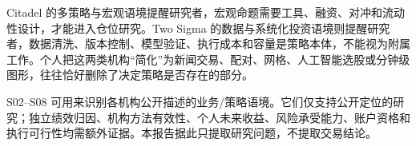 Citadel 的多策略与宏观语境提醒研究者，宏观命题需要工具、融资、对冲和流动性设计，才能进入仓位研究。Two Sigma 的数据与系统化投资语境则提醒研究者，数据清洗、版本控制、模型验证、执行成本和容量是策略本体，不能视为附属工作。个人把这两类机构“简化”为新闻交易、配对、网格、人工智能选股或分钟级图形，往往恰好删除了决定策略是否存在的部分。

\begin{sourcequalitybox}[管理人材料的证据限制]
S02--S08 可用来识别各机构公开描述的业务/策略语境。它们仅支持公开定位的研究；独立绩效归因、机构方法有效性、个人未来收益、风险承受能力、账户资格和执行可行性均需额外证据。本报告据此只提取研究问题，不提取交易结论。
\end{sourcequalitybox}
